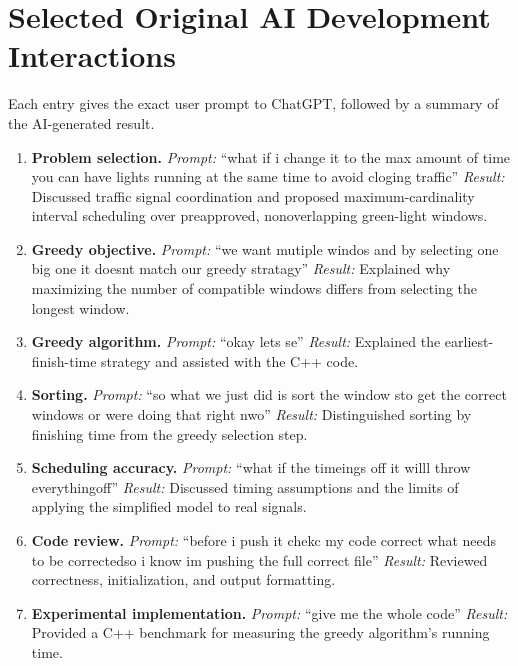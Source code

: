 \section{Selected Original AI Development Interactions}

Each entry gives the exact user prompt to ChatGPT,
followed by a summary of the AI-generated result.

\begin{enumerate}

\item \textbf{Problem selection.}
\emph{Prompt:} ``what if i change it to the max amount
of time you can have lights running at the same time
to avoid cloging traffic''
\emph{Result:} Discussed traffic signal coordination
and proposed maximum-cardinality interval scheduling
over preapproved, nonoverlapping green-light windows.

\item \textbf{Greedy objective.}
\emph{Prompt:} ``we want mutiple windos and by selecting
one big one it doesnt match our greedy stratagy''
\emph{Result:} Explained why maximizing the number of
compatible windows differs from selecting the longest
window.

\item \textbf{Greedy algorithm.}
\emph{Prompt:} ``okay lets se''
\emph{Result:} Explained the earliest-finish-time
strategy and assisted with the C++ code.

\item \textbf{Sorting.}
\emph{Prompt:} ``so what we just did is sort the window
sto get the correct windows or were doing that right
nwo''
\emph{Result:} Distinguished sorting by finishing time
from the greedy selection step.

\item \textbf{Scheduling accuracy.}
\emph{Prompt:} ``what if the timeings off it willl throw
everythingoff''
\emph{Result:} Discussed timing assumptions and the
limits of applying the simplified model to real
signals.

\item \textbf{Code review.}
\emph{Prompt:} ``before i push it chekc my code correct
what needs to be correctedso i know im pushing the full
correct file''
\emph{Result:} Reviewed correctness, initialization,
and output formatting.

\item \textbf{Experimental implementation.}
\emph{Prompt:} ``give me the whole code''
\emph{Result:} Provided a C++ benchmark for measuring
the greedy algorithm's running time.


\end{enumerate}
